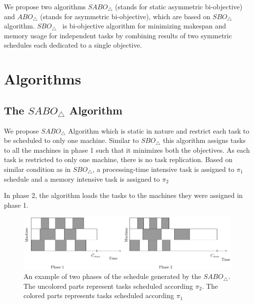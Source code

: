 \documentclass[twocolumn]{svjour3}
\begin{document}
We propose two algorithms $SABO_\triangle$ (stands for static
asymmetric bi-objective) and $ABO_\triangle$ (stands for asymmetric
bi-objective), which are based on $SBO_\triangle$
algorithm. $SBO_\triangle$~\cite{10.1109/IPDPS.2008.4536292} is
bi-objective algorithm for minimizing makespan and memory usage for
independent tasks by combining results of two symmetric schedules each
dedicated to a single objective.
    
\section{Algorithms}
 
\subsection{The $SABO_\triangle$ Algorithm}
                     
We propose $SABO_\triangle$ Algorithm which is static in nature and
restrict each task to be scheduled to only one machine. Similar to
$SBO_\triangle$ this algorithm assigns tasks to all the machines in
phase 1 such that it minimizes both the objectives. As each task is
restricted to only one machine, there is no task replication. Based on
similar condition as in $SBO_\triangle$, a processing-time intensive
task is assigned to $\pi_1$ schedule and a memory intensive task is
assigned to $\pi_2$
                     
In phase 2, the algorithm loads the tasks to the machines they were assigned in phase 1.\\
                     
\begin{figure}[htp]
  \centering
  \includegraphics[width= 16 cm]{mem2.pdf}
  \caption{An example of two phases of the schedule generated by the
    $SABO_\triangle$. The uncolored parts represent tasks scheduled
    according $\pi_2$. The colored parts represents tasks scheduled
    according $\pi_1$}
  \label{fig:ch5-1}
\end{figure} 
\end{document}
